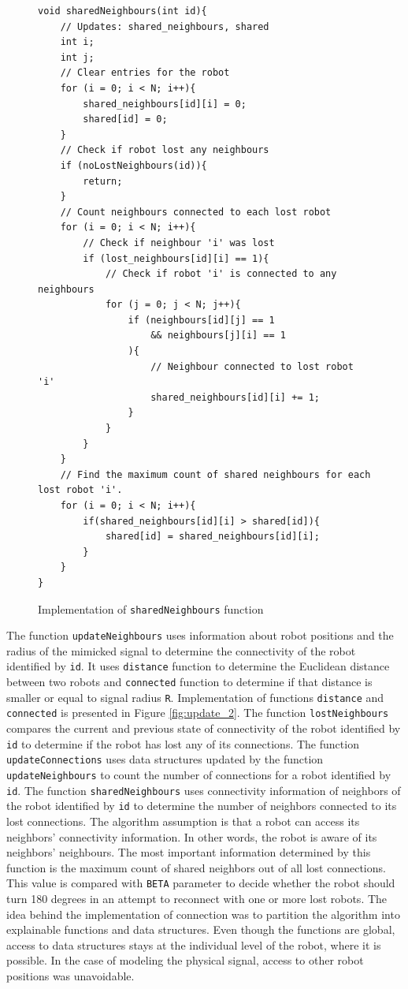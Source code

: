 \begin{figure}[H]
\caption{Implementation of \texttt{sharedNeighbours} function}
\begin{lstlisting}[style=C++]
void sharedNeighbours(int id){
    // Updates: shared_neighbours, shared
    int i;
    int j; 
    // Clear entries for the robot
    for (i = 0; i < N; i++){
        shared_neighbours[id][i] = 0;
        shared[id] = 0;
    }
    // Check if robot lost any neighbours
    if (noLostNeighbours(id)){
        return;
    }
    // Count neighbours connected to each lost robot 
    for (i = 0; i < N; i++){
        // Check if neighbour 'i' was lost
        if (lost_neighbours[id][i] == 1){
            // Check if robot 'i' is connected to any neighbours
            for (j = 0; j < N; j++){
                if (neighbours[id][j] == 1 
                    && neighbours[j][i] == 1
                ){
                    // Neighbour connected to lost robot 'i'
                    shared_neighbours[id][i] += 1;
                }
            }
        }
    }
    // Find the maximum count of shared neighbours for each lost robot 'i'.
    for (i = 0; i < N; i++){
        if(shared_neighbours[id][i] > shared[id]){
            shared[id] = shared_neighbours[id][i];
        }
    }
}
\end{lstlisting}
\label{fig:update_1}
\end{figure}
\noindent
The function \texttt{updateNeighbours} uses information about robot positions and the radius of the mimicked signal to determine the connectivity of the robot identified by \texttt{id}. It uses \texttt{distance} function to determine the Euclidean distance between two robots and \texttt{connected} function to determine if that distance is smaller or equal to signal radius \texttt{R}. Implementation of functions \texttt{distance} and \texttt{connected} is presented in Figure \ref{fig:update_2}. The function \texttt{lostNeighbours} compares the current and previous state of connectivity of the robot identified by \texttt{id} to determine if the robot has lost any of its connections. The function \texttt{updateConnections} uses data structures updated by the function \texttt{updateNeighbours} to count the number of connections for a robot identified by \texttt{id}. The function \texttt{sharedNeighbours} uses connectivity information of neighbors of the robot identified by \texttt{id} to determine the number of neighbors connected to its lost connections. The algorithm assumption is that a robot can access its neighbors' connectivity information. In other words, the robot is aware of its neighbors' neighbours. The most important information determined by this function is the maximum count of shared neighbors out of all lost connections. This value is compared with \texttt{BETA} parameter to decide whether the robot should turn 180 degrees in an attempt to reconnect with one or more lost robots. The idea behind the implementation of connection was to partition the algorithm into explainable functions and data structures. Even though the functions are global, access to data structures stays at the individual level of the robot, where it is possible. In the case of modeling the physical signal, access to other robot positions was unavoidable.

